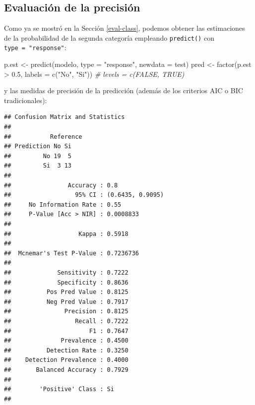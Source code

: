 \documentclass[
]{book}
\newenvironment{Shaded}{\begin{snugshade}}{\end{snugshade}}
\newcommand{\AttributeTok}[1]{\textcolor[rgb]{0.77,0.63,0.00}{#1}}
\newcommand{\CommentTok}[1]{\textcolor[rgb]{0.56,0.35,0.01}{\textit{#1}}}
\newcommand{\FloatTok}[1]{\textcolor[rgb]{0.00,0.00,0.81}{#1}}
\newcommand{\FunctionTok}[1]{\textcolor[rgb]{0.00,0.00,0.00}{#1}}
\newcommand{\NormalTok}[1]{#1}
\newcommand{\OtherTok}[1]{\textcolor[rgb]{0.56,0.35,0.01}{#1}}
\newcommand{\SpecialCharTok}[1]{\textcolor[rgb]{0.00,0.00,0.00}{#1}}
\newcommand{\StringTok}[1]{\textcolor[rgb]{0.31,0.60,0.02}{#1}}
\theoremstyle{break}
\theoremstyle{definition}
\theoremstyle{definition}
\theoremstyle{definition}
\theoremstyle{definition}
\theoremstyle{remark}
\begin{document}
\hypertarget{evaluaciuxf3n-de-la-precisiuxf3n-1}{%
\subsection{Evaluación de la precisión}\label{evaluaciuxf3n-de-la-precisiuxf3n-1}}

Como ya se mostró en la Sección \ref{eval-class}, podemos obtener las estimaciones de la probabilidad de la segunda categoría empleando \texttt{predict()} con \texttt{type\ =\ "response"}:

\begin{Shaded}
\begin{Highlighting}[]
\NormalTok{p.est }\OtherTok{\textless{}{-}} \FunctionTok{predict}\NormalTok{(modelo, }\AttributeTok{type =} \StringTok{"response"}\NormalTok{, }\AttributeTok{newdata =}\NormalTok{ test)}
\NormalTok{pred }\OtherTok{\textless{}{-}} \FunctionTok{factor}\NormalTok{(p.est }\SpecialCharTok{\textgreater{}} \FloatTok{0.5}\NormalTok{, }\AttributeTok{labels =} \FunctionTok{c}\NormalTok{(}\StringTok{"No"}\NormalTok{, }\StringTok{"Si"}\NormalTok{)) }\CommentTok{\# levels = c(\textquotesingle{}FALSE\textquotesingle{}, \textquotesingle{}TRUE\textquotesingle{})}
\end{Highlighting}
\end{Shaded}

y las medidas de precisión de la predicción (además de los criterios AIC o BIC tradicionales):

\begin{Shaded}
\end{Shaded}

\begin{verbatim}
## Confusion Matrix and Statistics
## 
##           Reference
## Prediction No Si
##         No 19  5
##         Si  3 13
##                                           
##                Accuracy : 0.8             
##                  95% CI : (0.6435, 0.9095)
##     No Information Rate : 0.55            
##     P-Value [Acc > NIR] : 0.0008833       
##                                           
##                   Kappa : 0.5918          
##                                           
##  Mcnemar's Test P-Value : 0.7236736       
##                                           
##             Sensitivity : 0.7222          
##             Specificity : 0.8636          
##          Pos Pred Value : 0.8125          
##          Neg Pred Value : 0.7917          
##               Precision : 0.8125          
##                  Recall : 0.7222          
##                      F1 : 0.7647          
##              Prevalence : 0.4500          
##          Detection Rate : 0.3250          
##    Detection Prevalence : 0.4000          
##       Balanced Accuracy : 0.7929          
##                                           
##        'Positive' Class : Si              
## 
\end{verbatim}
\end{document}
